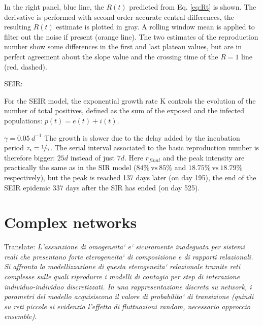 \documentclass[DIV=12, BCOR=0pt]{scrartcl}  %
\begin{document}
	In the right panel, blue line, the $R(t)$ predicted from Eq. \ref{eq:Rt} is shown. 
	The derivative is performed with second order accurate central differences, the resulting $R(t)$ estimate is plotted in gray. A rolling window mean is applied to filter out the noise if present (orange line). The two estimates of the reproduction number show some differences in the first and last plateau values, but are in perfect agreement about the slope value and the crossing time of the $R = 1$ line (red, dashed).
	
	
	SEIR:	
	
	For the SEIR model, the exponential growth rate K controls the evolution of the number of total positives, defined as the sum of the exposed and the infected populations: $p(t) = e(t) + i(t)$. 
	
	
	$\gamma = 0.05 \ d^{-1}$ The growth is slower due to the delay added by the incubation period $\tau_{i}=\sfrac{1}{\gamma}$. The serial interval associated to the basic reproduction number is therefore bigger: $25 d$ instead of just $7 d$. Here $r_{final}$ and the peak intensity are practically the same as in the SIR model ($84 \% \ \mathrm{vs} \ 85 \%$ and $18.75 \% \ \mathrm{vs} \ 18.79 \% \ $ respectively), but the peak is reached 137 days later (on day 195), the end of the SEIR epidemic 337 days after the SIR has ended (on day 525). %
  
  
  
  \section{Complex networks}
  Translate: \textit{L'assunzione di omogeneita` e` sicuramente inadeguata per sistemi reali che presentano forte eterogeneita` di composizione e di rapporti relazionali. Si affronta la modellizzazione di questa eterogeneita` relazionale tramite reti complesse sulle quali riprodurre i modelli di contagio per step di interazione individuo-individuo discretizzati. In una rappresentazione discreta su network, i parametri del modello acquisiscono il valore di probabilita` di transizione (quindi su reti piccole si evidenzia l'effetto di fluttuazioni random, necessario approccio ensemble).  }
  
\end{document}
